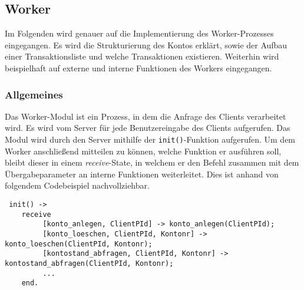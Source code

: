 \subsection{Worker}
Im Folgenden wird genauer auf die Implementierung des Worker-Prozesses eingegangen. Es wird die Strukturierung des Kontos erklärt, sowie der Aufbau einer Transaktionsliste und welche Transaktionen existieren. Weiterhin wird beispielhaft auf externe und interne Funktionen des Workers eingegangen.
\subsubsection{Allgemeines}
Das Worker-Modul ist ein Prozess, in dem die Anfrage des Clients verarbeitet wird. Es wird vom Server für jede Benutzereingabe des Clients aufgerufen. Das Modul wird durch den Server mithilfe der \texttt{init()}-Funktion aufgerufen. Um dem Worker anschließend mitteilen zu können, welche Funktion er ausführen soll, bleibt dieser in einem \textit{receive}-State, in welchem er den Befehl zusammen mit dem Übergabeparameter an interne Funktionen weiterleitet. Dies ist anhand von folgendem Codebeispiel nachvollziehbar.
\begin{lstlisting}
 init() -> 
 	receive
 	     [konto_anlegen, ClientPId] -> konto_anlegen(ClientPId);
 	     [konto_loeschen, ClientPId, Kontonr] -> konto_loeschen(ClientPId, Kontonr);
 	     [kontostand_abfragen, ClientPId, Kontonr] -> kontostand_abfragen(ClientPId, Kontonr);
 	     ...
 	end.
\end{lstlisting}
